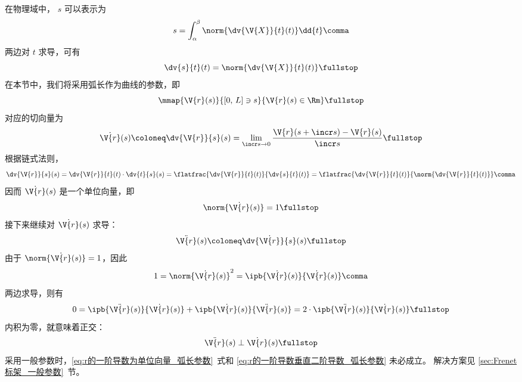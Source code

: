 在物理域中， $s$ 可以表示为
\begin{equation}
	s=\int_\alpha^\beta \norm{\dv{\V{X}}{t} (t)} \dd{t} \comma
	\label{eq:弧长的定义}
\end{equation}
两边对 $t$ 求导，可有
\begin{equation}
	\dv{s}{t} (t) = \norm{\dv{\V{X}}{t} (t)} \fullstop
	\label{eq:弧长与一般参数的关系}
\end{equation}
在本节中，我们将采用弧长作为曲线的参数，即
\begin{equation}
	\mmap{\V{r}(s)}{[0,\,L]\ni s}{\V{r}(s)\in\Rm} \fullstop
\end{equation}
对应的切向量为
\begin{equation}
	\dot{\V{r}}(s)\coloneq\dv{\V{r}}{s} (s)
	=\lim_{\incr s\to 0} \frac{\V{r}(s+\incr s)-\V{r}(s)}{\incr s}
	\fullstop
\end{equation}
根据链式法则，
\begin{equation}
	\dv{\V{r}}{s} (s)
	=\dv{\V{r}}{t} (t) \cdot \dv{t}{s} (s)
	=\flatfrac{\dv{\V{r}}{t} (t)}{\dv{s}{t} (t)}
	=\flatfrac{\dv{\V{r}}{t} (t)}{\norm{\dv{\V{r}}{t} (t)}} \comma
\end{equation}
因而 $\dot{\V{r}}(s)$ 是一个单位向量，即
\begin{equation}
	\norm{\dot{\V{r}}(s)}=1 \fullstop
	\label{eq:r的一阶导数为单位向量_弧长参数}
\end{equation}
接下来继续对 $\dot{\V{r}}(s)$ 求导：
\begin{equation}
	\ddot{\V{r}}(s)\coloneq\dv{\dot{\V{r}}}{s} (s) \fullstop
\end{equation}
由于 $\norm{\dot{\V{r}}(s)}=1$，因此
\begin{equation}
	1=\norm{\dot{\V{r}}(s)}^2
	=\ipb{\vphantom{0^0} \dot{\V{r}}(s)}{\dot{\V{r}}(s)} \comma
\end{equation}
两边求导，则有
\begin{equation}
	0=\ipb{\vphantom{0^0} \ddot{\V{r}}(s)}{\dot{\V{r}}(s)}
		+\ipb{\vphantom{0^0} \dot{\V{r}}(s)}{\ddot{\V{r}}(s)}
	=2\cdot\ipb{\vphantom{0^0} \ddot{\V{r}}(s)}{\dot{\V{r}}(s)}
	\fullstop
\end{equation}
内积为零，就意味着正交：
\begin{equation}
	\ddot{\V{r}}(s) \perp \dot{\V{r}}(s) \fullstop
	\label{eq:r的一阶导数垂直二阶导数_弧长参数}
\end{equation}
采用一般参数时，\eqref{eq:r的一阶导数为单位向量_弧长参数}~式和
\eqref{eq:r的一阶导数垂直二阶导数_弧长参数} 未必成立。
解决方案见 \ref{sec:Frenet标架_一般参数}~节。

